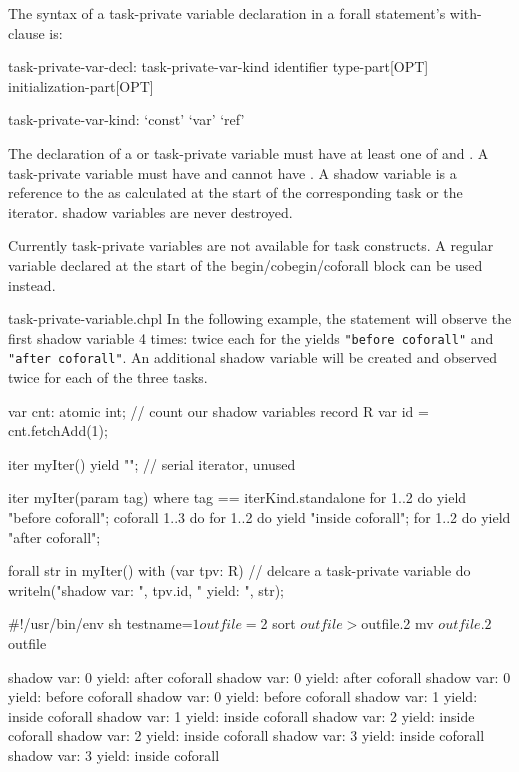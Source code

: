 The syntax of a task-private variable declaration in a forall statement's
with-clause is:

\begin{syntax}
task-private-var-decl:
  task-private-var-kind identifier type-part[OPT] initialization-part[OPT]

task-private-var-kind:
  `const'
  `var'
  `ref'
\end{syntax}

The declaration of a  or  task-private variable must
have at least one of  and .
A  task-private variable must have 
and cannot have . A  shadow variable
is a reference to the  as calculated at
the start of the corresponding task or the iterator.
 shadow variables are never destroyed.

\begin{craychapel}
Currently task-private variables are not available for task constructs.
A regular variable declared at the start of the begin/cobegin/coforall
block can be used instead.
\end{craychapel}

\begin{chapelexample}{task-private-variable.chpl}
In the following example, the  statement will observe
the first shadow variable 4 times: twice each for the yields
{\tt "before coforall"} and {\tt "after coforall"}.
An additional shadow variable will be created and observed twice
for each of the three  tasks.
\begin{chapel}
var cnt: atomic int;                     // count our shadow variables
record R { var id = cnt.fetchAdd(1); }

iter myIter() { yield ""; }              // serial iterator, unused

iter myIter(param tag) where tag == iterKind.standalone {
  for 1..2 do
    yield "before coforall";
  coforall 1..3 do
    for 1..2 do
      yield "inside coforall";
  for 1..2 do
    yield "after coforall";
}

forall str in myIter()
  with (var tpv: R)                      // delcare a task-private variable
do
  writeln("shadow var: ", tpv.id, "  yield: ", str);
\end{chapel}
\begin{chapelprediff}
\#!/usr/bin/env sh
testname=$1
outfile=$2
sort $outfile > $outfile.2
mv $outfile.2 $outfile
\end{chapelprediff}
\begin{chapeloutput}
shadow var: 0  yield: after coforall
shadow var: 0  yield: after coforall
shadow var: 0  yield: before coforall
shadow var: 0  yield: before coforall
shadow var: 1  yield: inside coforall
shadow var: 1  yield: inside coforall
shadow var: 2  yield: inside coforall
shadow var: 2  yield: inside coforall
shadow var: 3  yield: inside coforall
shadow var: 3  yield: inside coforall
\end{chapeloutput}
\end{chapelexample}


